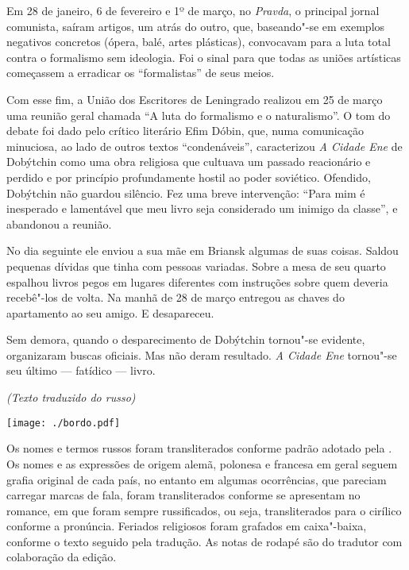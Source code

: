 Em 28 de janeiro, 6 de fevereiro e 1º de março, no \emph{Pravda}, o
principal jornal comunista, saíram artigos, um atrás do outro, que,
baseando"-se em exemplos negativos concretos (ópera, balé, artes
plásticas), convocavam para a luta total contra o formalismo sem
ideologia. Foi o sinal para que todas as uniões artísticas começassem a
erradicar os ``formalistas'' de seus meios.

Com esse fim, a União dos Escritores de Leningrado realizou em 25 de
março uma reunião geral chamada ``A luta do formalismo e o
naturalismo''. O tom do debate foi dado pelo crítico literário Efim
Dóbin, que, numa comunicação minuciosa, ao lado de outros textos
``condenáveis'', caracterizou \emph{A Cidade Ene} de Dobýtchin como uma
obra religiosa que cultuava um passado reacionário e perdido e por
princípio profundamente hostil ao poder soviético. Ofendido, Dobýtchin
não guardou silêncio. Fez uma breve intervenção: ``Para mim é inesperado
e lamentável que meu livro seja considerado um inimigo da classe'', e
abandonou a reunião.

No dia seguinte ele enviou a sua mãe em Briansk algumas de suas coisas.
Saldou pequenas dívidas que tinha com pessoas variadas. Sobre a mesa de
seu quarto espalhou livros pegos em lugares diferentes com instruções
sobre quem deveria recebê"-los de volta. Na manhã de 28 de março entregou
as chaves do apartamento ao seu amigo. E desapareceu.

Sem demora, quando o desparecimento de Dobýtchin tornou"-se evidente,
organizaram buscas oficiais. Mas não deram resultado. \emph{A Cidade
Ene} tornou"-se seu último --- fatídico --- livro.


\begin{flushright}
\emph{(Texto traduzido do russo)}
\end{flushright}

\pagebreak
\thispagestyle{empty}

\vspace*{7.3cm}\hspace*{-3.2cm}\texttt{[image: ./bordo.pdf]}


\pagebreak
\thispagestyle{empty}

\begin{vplace}[60]
\begin{centering}
{\small{
Os nomes e termos russos foram transliterados conforme padrão adotado pela \scalebox{.8}{USP}. Os nomes e as expressões de origem alemã, polonesa e francesa em geral seguem grafia original de cada país, no entanto em algumas ocorrências, que pareciam carregar marcas de fala, foram transliterados conforme se apresentam no romance, em que foram sempre russificados, ou seja, transliterados para o cirílico conforme a pronúncia. Feriados religiosos foram grafados em caixa"-baixa, conforme o texto seguido pela tradução. As notas de rodapé são do tradutor com colaboração da edição.
}}
\end{centering}
\end{vplace}
\thispagestyle{empty}